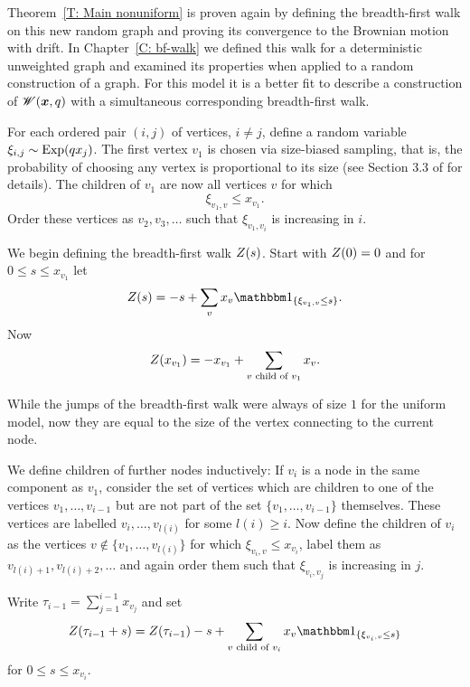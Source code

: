 Theorem~\ref{T: Main nonuniform} is proven again by defining the breadth-first walk on this new random graph
and proving its convergence to the Brownian motion with drift.
In Chapter~\ref{C: bf-walk} we defined this walk for a deterministic unweighted graph 
and examined its properties when applied to a random construction of a graph.
For this model it is a better fit to describe a construction of $\mathscr{W}(\boldsymbol{x}, q)$ with a simultaneous corresponding breadth-first walk.

For each ordered pair $(i, j)$ of vertices, $i \neq j$, define a random variable $\xi_{i,j} \sim \operatorname*{Exp}(q x_j)$.
The first vertex $v_1$ is chosen via size-biased sampling, that is, the probability of choosing any vertex is proportional to its size
(see Section 3.3 of \cite{Aldous.1997} for details).
The children of $v_1$ are now all vertices $v$ for which
\begin{equation}
	\xi_{v_1, v} \leq x_{v_1}.
\end{equation}
Order these vertices as $v_2, v_3, \dots$ such that $\xi_{v_1, v_i}$ is increasing in $i$.

We begin defining the breadth-first walk $Z(s)$.
Start with $Z(0) = 0$ and for $0 \leq s \leq x_{v_1}$ let
\begin{equation}
	\bfw(s) = -s + \sum_{v} x_v \Ind{\{\xi_{v_1, v} \leq s\}}.
\end{equation}
Now
\begin{equation}
	Z(x_{v_1}) = -x_{v_1} + \sum_{\text{$v$ child of $v_1$}} x_v.
\end{equation}


While the jumps of the breadth-first walk were always of size $1$ for the uniform model,
now they are equal to the size of the vertex connecting to the current node.

We define children of further nodes inductively:
If $v_i$ is a node in the same component as $v_1$,
consider the set of vertices which are children to one of the vertices $v_1, \dots, v_{i-1}$
but are not part of the set $\{v_1, \dots, v_{i-1}\}$ themselves.
These vertices are labelled $v_i, \dots, v_{l(i)}$ for some $l(i) \geq i$.
Now define the children of $v_i$ as the vertices 
$v \notin \{v_1, \dots, v_{l(i)}\}$ for which $\xi_{v_i, v} \leq x_{v_i}$,
label them as $v_{l(i) + 1}, v_{l(i) + 2}, \dots$ 
and again order them such that $\xi_{v_i, v_j}$ is increasing in $j$.
 
Write $\tau_{i-1} = \sum_{j = 1}^{i-1} x_{v_j}$ and set
\begin{equation}
	\bfw(\tau_{i-1} + s) = \bfw(\tau_{i-1}) - s + \sum_{\text{$v$ child of $v_i$}} x_v \Ind{\{\xi_{v_i, v} \leq s\}}
\end{equation}
for $0 \leq s \leq x_{v_i}$.

